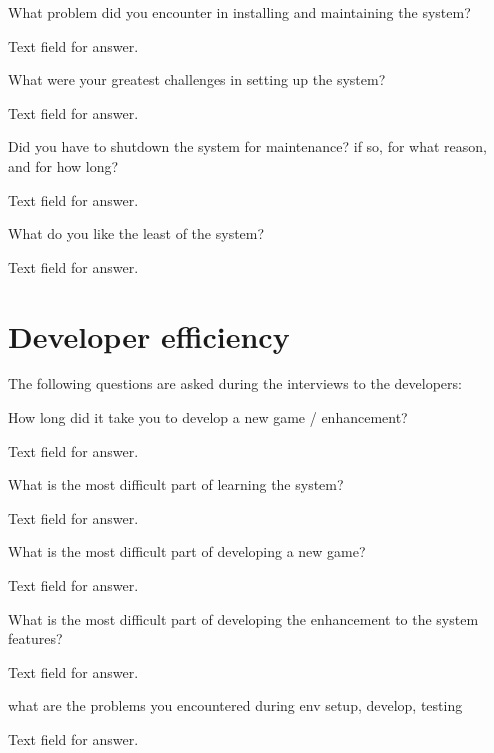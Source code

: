 \begin{question}
	\item What problem did you encounter in installing and maintaining the system?
\end{question}

Text field for answer.

\begin{question}
	\item What were your greatest challenges in setting up the system?
\end{question}

Text field for answer.

\begin{question}
	\item Did you have to shutdown the system for maintenance? if so, for what reason, and for how long?
\end{question}

Text field for answer.

\begin{question}
	\item What do you like the least of the system?
\end{question}

Text field for answer.

\section{Developer efficiency}

The following questions are asked during the interviews to the developers:

\begin{question}
	\item How long did it take you to develop a new game / enhancement?
\end{question}

Text field for answer.

\begin{question}
	\item What is the most difficult part of learning the system?
\end{question}

Text field for answer.

\begin{question}
	\item What is the most difficult part of developing a new game?
\end{question}

Text field for answer.

\begin{question}
	\item What is the most difficult part of developing the enhancement to the system features?
\end{question}

Text field for answer.

\begin{question}
	\item what are the problems you encountered during env setup, develop, testing
\end{question}

Text field for answer.

